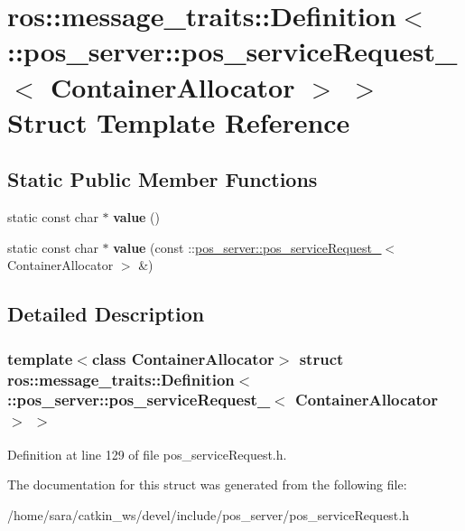 \hypertarget{structros_1_1message__traits_1_1Definition_3_01_1_1pos__server_1_1pos__serviceRequest___3_01ContainerAllocator_01_4_01_4}{}\section{ros\+:\+:message\+\_\+traits\+:\+:Definition$<$ \+:\+:pos\+\_\+server\+:\+:pos\+\_\+service\+Request\+\_\+$<$ Container\+Allocator $>$ $>$ Struct Template Reference}
\label{structros_1_1message__traits_1_1Definition_3_01_1_1pos__server_1_1pos__serviceRequest___3_01ContainerAllocator_01_4_01_4}
\subsection*{Static Public Member Functions}
\begin{DoxyCompactItemize}
\item 
\mbox{\label{structros_1_1message__traits_1_1Definition_3_01_1_1pos__server_1_1pos__serviceRequest___3_01ContainerAllocator_01_4_01_4_ab95d9dee218552d8207ee64fb3f5a45e}} 
static const char $\ast$ {\bfseries value} ()
\item 
\mbox{\label{structros_1_1message__traits_1_1Definition_3_01_1_1pos__server_1_1pos__serviceRequest___3_01ContainerAllocator_01_4_01_4_a13fc32a7de566808ec91bd5780ee705d}} 
static const char $\ast$ {\bfseries value} (const \+::\hyperlink{structpos__server_1_1pos__serviceRequest__}{pos\+\_\+server\+::pos\+\_\+service\+Request\+\_\+}$<$ Container\+Allocator $>$ \&)
\end{DoxyCompactItemize}


\subsection{Detailed Description}
\subsubsection*{template$<$class Container\+Allocator$>$\newline
struct ros\+::message\+\_\+traits\+::\+Definition$<$ \+::pos\+\_\+server\+::pos\+\_\+service\+Request\+\_\+$<$ Container\+Allocator $>$ $>$}



Definition at line 129 of file pos\+\_\+service\+Request.\+h.



The documentation for this struct was generated from the following file\+:\begin{DoxyCompactItemize}
\item 
/home/sara/catkin\+\_\+ws/devel/include/pos\+\_\+server/pos\+\_\+service\+Request.\+h\end{DoxyCompactItemize}
